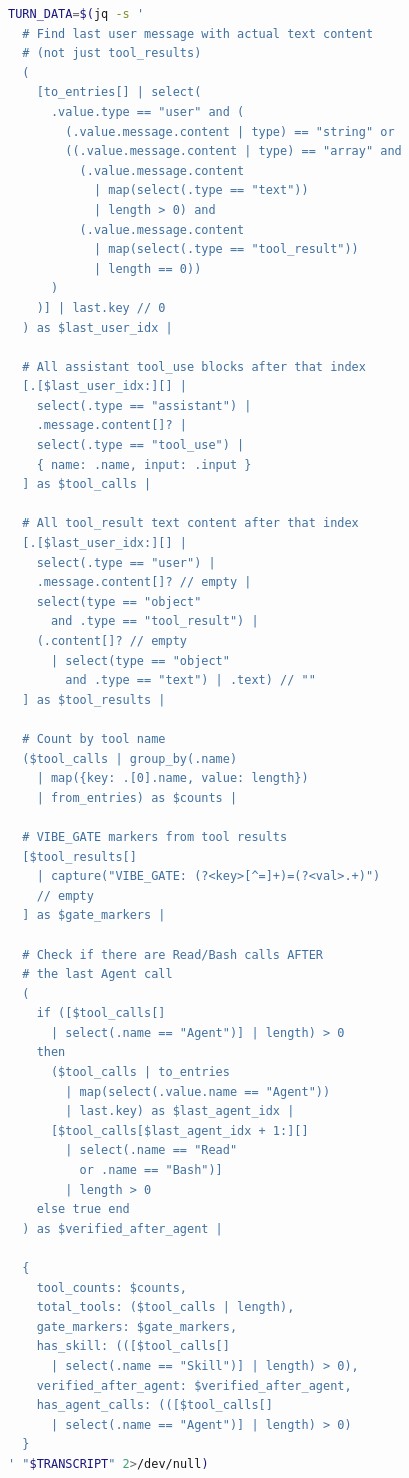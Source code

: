 \begin{lstlisting}[language=bash,caption={Phase A: Transcript extraction via jq.}]
TURN_DATA=$(jq -s '
  # Find last user message with actual text content
  # (not just tool_results)
  (
    [to_entries[] | select(
      .value.type == "user" and (
        (.value.message.content | type) == "string" or
        ((.value.message.content | type) == "array" and
          (.value.message.content
            | map(select(.type == "text"))
            | length > 0) and
          (.value.message.content
            | map(select(.type == "tool_result"))
            | length == 0))
      )
    )] | last.key // 0
  ) as $last_user_idx |

  # All assistant tool_use blocks after that index
  [.[$last_user_idx:][] |
    select(.type == "assistant") |
    .message.content[]? |
    select(.type == "tool_use") |
    { name: .name, input: .input }
  ] as $tool_calls |

  # All tool_result text content after that index
  [.[$last_user_idx:][] |
    select(.type == "user") |
    .message.content[]? // empty |
    select(type == "object"
      and .type == "tool_result") |
    (.content[]? // empty
      | select(type == "object"
        and .type == "text") | .text) // ""
  ] as $tool_results |

  # Count by tool name
  ($tool_calls | group_by(.name)
    | map({key: .[0].name, value: length})
    | from_entries) as $counts |

  # VIBE_GATE markers from tool results
  [$tool_results[]
    | capture("VIBE_GATE: (?<key>[^=]+)=(?<val>.+)")
    // empty
  ] as $gate_markers |

  # Check if there are Read/Bash calls AFTER
  # the last Agent call
  (
    if ([$tool_calls[]
      | select(.name == "Agent")] | length) > 0
    then
      ($tool_calls | to_entries
        | map(select(.value.name == "Agent"))
        | last.key) as $last_agent_idx |
      [$tool_calls[$last_agent_idx + 1:][]
        | select(.name == "Read"
          or .name == "Bash")]
        | length > 0
    else true end
  ) as $verified_after_agent |

  {
    tool_counts: $counts,
    total_tools: ($tool_calls | length),
    gate_markers: $gate_markers,
    has_skill: (([$tool_calls[]
      | select(.name == "Skill")] | length) > 0),
    verified_after_agent: $verified_after_agent,
    has_agent_calls: (([$tool_calls[]
      | select(.name == "Agent")] | length) > 0)
  }
' "$TRANSCRIPT" 2>/dev/null)
\end{lstlisting}

